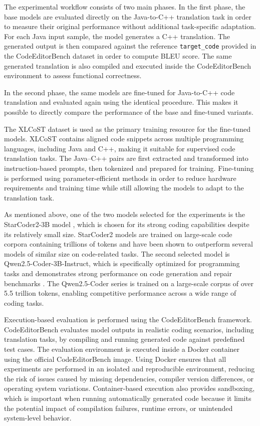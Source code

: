 The experimental workflow consists of two main phases. In the first phase, the
base models are evaluated directly on the Java-to-C++ translation task in order
to measure their original performance without additional task-specific
adaptation. For each Java input sample, the model generates a C++ translation.
The generated output is then compared against the reference
\texttt{target\_code} provided in the CodeEditorBench dataset in order to
compute BLEU score. The same generated translation is also compiled and
executed inside the CodeEditorBench environment to assess functional
correctness.

In the second phase, the same models are fine-tuned for Java-to-C++ code
translation and evaluated again using the identical procedure. This makes it
possible to directly compare the performance of the base and fine-tuned
variants.

The XLCoST dataset is used as the primary training resource for the fine-tuned models. XLCoST
contains aligned code snippets across multiple programming languages, including
Java and C++, making it suitable for supervised code translation tasks. The
Java--C++ pairs are first extracted and transformed into instruction-based
prompts, then tokenized and prepared for training. Fine-tuning is performed
using parameter-efficient methods in order to reduce hardware requirements and
training time while still allowing the models to adapt to the translation task.

As mentioned above, one of the two models selected for the experiments is the
StarCoder2-3B model \cite{starcoder2, starcoder2_hf}, which is chosen for its
strong coding capabilities despite its relatively small size. StarCoder2 models
are trained on large-scale code corpora containing trillions of tokens and have
been shown to outperform several models of similar size on code-related tasks.
The second selected model is Qwen2.5-Coder-3B-Instruct, which is specifically
optimized for programming tasks and demonstrates strong performance on code
generation and repair benchmarks \cite{qwen_coder, qwen_coder_report}. The
Qwen2.5-Coder series is trained on a large-scale corpus of over 5.5 trillion
tokens, enabling competitive performance across a wide range of coding tasks.

Execution-based evaluation is performed using the CodeEditorBench framework.
CodeEditorBench evaluates model outputs in realistic coding scenarios,
including translation tasks, by compiling and running generated code against
predefined test cases. The evaluation environment is
executed inside a Docker container using the official CodeEditorBench image.
Using Docker ensures that all experiments are performed in an isolated and
reproducible environment, reducing the risk of issues caused by missing
dependencies, compiler version differences, or operating system variations.
Container-based execution also provides sandboxing, which is important when
running automatically generated code because it limits the potential impact of
compilation failures, runtime errors, or unintended system-level behavior.

